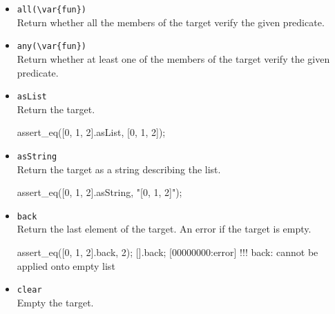 \begin{itemize}
\item \lstinline|all(\var{fun})|\\
Return whether all the members of the target verify the given
predicate.


\item \lstinline|any(\var{fun})|\\
Return whether at least one of the members of the target verify the
given predicate.


\item \lstinline|asList|\\
Return the target.

\begin{urbiscript}[firstnumber=last]
assert_eq([0, 1, 2].asList, [0, 1, 2]);
\end{urbiscript}

\item \lstinline|asString|\\
Return the target as a string describing the list.

\begin{urbiscript}[firstnumber=last]
assert_eq([0, 1, 2].asString, "[0, 1, 2]");
\end{urbiscript}

\item \lstinline|back|\\
Return the last element of the target. An error if the target is empty.

\begin{urbiscript}[firstnumber=last]
assert_eq([0, 1, 2].back, 2);
[].back;
[00000000:error] !!! back: cannot be applied onto empty list
\end{urbiscript}

\item \lstinline|clear|\\
Empty the target.


\end{itemize}
